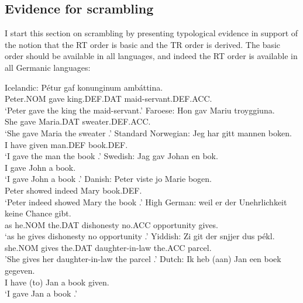 	\subsection{Evidence for scrambling}
	I start this section on scrambling by presenting typological evidence in support of the notion that the RT order is basic and the TR order is derived. The basic order should be available in all languages, and indeed the RT order is available in all Germanic languages:
	\begin{exe}
\ex
\begin{xlist}
	\ex Icelandic: \label{ex:ice-rt}
\gll P\'{e}tur gaf konunginum amb\'{a}ttina.\\
Peter.NOM gave king.DEF.DAT maid-servant.DEF.ACC.\\
\trans `Peter gave the king the maid-servant.'\pagebreak
\ex Faroese:\label{ex:far-rt}
\gll Hon gav Mariu troyggiuna.\\
She gave Maria.DAT sweater.DEF.ACC.\\
\trans `She gave Maria the sweater \citep{Lundquist.2013b}.'
\ex Standard Norwegian: \label{ex:nor-rt}
\gll Jeg har gitt mannen boken.\\
I have given man.DEF book.DEF.\\
\trans `I gave the man the book \citep[ex 10]{Sprouse.1995}.'
\ex Swedish:\label{ex:sw-rt}
\gll Jag gav Johan en bok.\\
I gave John a book.\\
\trans `I gave John a book \citep{Holmberg.1995}.'
\ex Danish:\label{ex:dan-rt}
\gll Peter viste jo Marie bogen.\\
Peter showed indeed Mary book.DEF.\\
\trans `Peter indeed showed Mary the book \citep{Vikner.1989}.'
\ex High German:\label{ex:hg-rt}
\gll weil er der Unehrlichkeit keine Chance gibt.\\
as he.NOM the.DAT dishonesty no.ACC opportunity gives.\\
\trans `as he gives dishonesty no opportunity \citep[162]{Draye.1996}.'
\ex Yiddish:\label{ex:yid-rt}
\gll Zi git der snjjer dus pékl. \\
she.NOM gives the.DAT daughter-in-law the.ACC parcel.\\
\trans 'She gives her daughter-in-law the parcel \citep[ex 190a]{Birnbaum.1979}.'
\ex Dutch:\label{ex:dut-rt}
\gll Ik heb (aan) Jan een boek gegeven.\\
I have (to) Jan a book given.\\
\trans `I gave Jan a book \citep{Tiersma.1985}.'\pagebreak

\end{xlist}
\end{exe}
